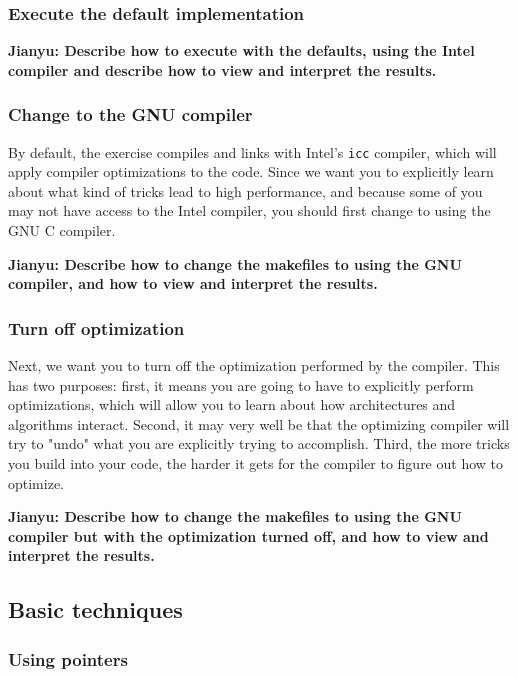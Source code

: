 \subsubsection{Execute the default implementation}

{\bf Jianyu: Describe how to execute with the defaults, using the Intel compiler and describe how to view and interpret the results.}

\subsubsection{Change to the GNU compiler}

By default, the exercise compiles and links with Intel's {\tt icc} compiler, which will apply compiler optimizations to the code.  Since we want you to explicitly learn about what kind of tricks lead to high performance, and because some of you may not have access to the Intel compiler, you should first change to using the GNU C compiler.

{\bf Jianyu: Describe how to change the makefiles to using the GNU compiler, and how to view and interpret the results.}

\subsubsection{Turn off optimization}

Next, we want you to turn off the optimization performed by the compiler.  This has two purposes: first, it means you are going to have to explicitly perform optimizations, which will allow you to learn about how architectures and algorithms interact.  Second, it may very well be that the optimizing compiler will try to "undo" what you are explicitly trying to accomplish.  Third, the more tricks you build into your code, the harder it gets for the compiler to figure out how to optimize.

{\bf Jianyu: Describe how to change the makefiles to using the GNU compiler but with the optimization turned off, and how to view and interpret the results.}


\subsection{Basic techniques}

\subsubsection{Using pointers}

